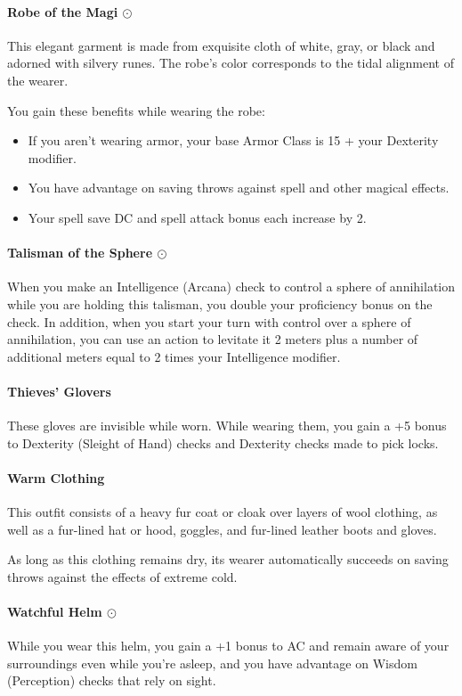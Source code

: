     \paragraph{Robe of the Magi $\odot$}
        This elegant garment is made from exquisite cloth of white, gray, or black and adorned with silvery runes.
        The robe's color corresponds to the tidal alignment of the wearer.

        You gain these benefits while wearing the robe:
        \begin{itemize}
            \item If you aren't wearing armor, your base Armor Class is 15 + your Dexterity modifier.
            \item You have advantage on saving throws against spell and other magical effects.
            \item Your spell save DC and spell attack bonus each increase by 2.
        \end{itemize}
    \paragraph{Talisman of the Sphere $\odot$}
        When you make an Intelligence (Arcana) check to control a sphere of annihilation while you are holding this talisman, you double your proficiency bonus on the check.
        In addition, when you start your turn with control over a sphere of annihilation, you can use an action to levitate it 2 meters plus a number of additional meters equal to 2 times your Intelligence modifier.
    \paragraph{Thieves' Glovers}
        These gloves are invisible while worn.
        While wearing them, you gain a +5 bonus to Dexterity (Sleight of Hand) checks and Dexterity checks made to pick locks.
    \paragraph{Warm Clothing}
        This outfit consists of a heavy fur coat or cloak over layers of wool clothing, as well as a fur-lined hat or hood, goggles, and fur-lined leather boots and gloves.

        As long as this clothing remains dry, its wearer automatically succeeds on saving throws against the effects of extreme cold.
    \paragraph{Watchful Helm $\odot$}
        While you wear this helm, you gain a +1 bonus to AC and remain aware of your surroundings even while you're asleep, and you have advantage on Wisdom (Perception) checks that rely on sight.
